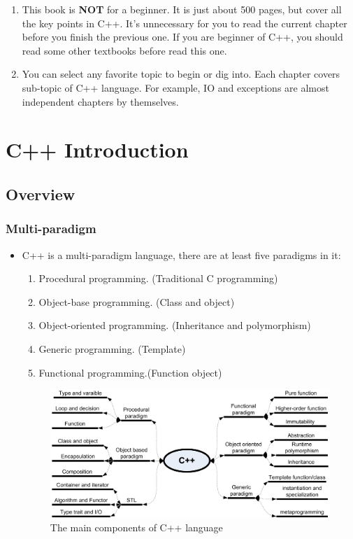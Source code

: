 \documentclass[a4paper,11pt,twoside]{book}
\begin{document}
\begin{itemize}
\begin{enumerate}
	\item This book is \textbf{NOT} for a beginner. It is just about 500 pages, but cover all the key points in C++. It's unnecessary for you to read the current chapter before you finish the previous one. If you are beginner of C++, you should read some other textbooks before read this one.

	\item You can select any favorite topic to begin or dig into. Each chapter covers sub-topic of C++ language. For example, IO and exceptions are almost independent chapters by themselves.
	\end{enumerate}

\end{itemize}

\chapter{C++ Introduction}

\section{Overview}
\subsection{Multi-paradigm}
\begin{itemize}
	\item C++ is a multi-paradigm language, there are at least five paradigms in it: 
	\begin{enumerate}
		\item Procedural programming. (Traditional C programming)
		\item Object-base programming. (Class and object)
		\item Object-oriented programming. (Inheritance and polymorphism)
		\item Generic programming. (Template)
		\item Functional programming.(Function object)
	\end{enumerate}
	
	\begin{figure}[h]
		\centering
		\includegraphics[width=0.85\linewidth]{pics/whole.png}
		\caption{The main components of C++ language}
		\label{fig:whole}
	\end{figure}

\end{itemize}
\end{document}

